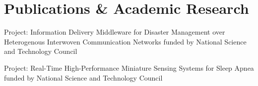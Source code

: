 \section{Publications \& Academic Research}
\begin{resumeitems}
\item {Project: Information Delivery Middleware for Disaster Management over Heterogenous Interwoven Communication Networks \textbar{} funded by National Science and Technology Council}
\item {Project: Real-Time High-Performance Miniature Sensing Systems for Sleep Apnea \textbar{} funded by National Science and Technology Council}
\end{resumeitems}
